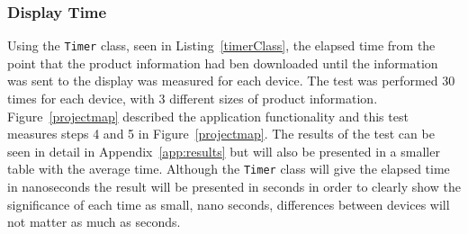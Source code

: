 %       
%		

\subsubsection{Display Time}

Using the \texttt{Timer} class, seen in Listing~\ref{timerClass}, the elapsed time from the point that the product information had ben downloaded until the information was sent to the display was measured for each device. The test was performed 30 times for each device, with 3 different sizes of product information. Figure~\ref{projectmap} described the application functionality and this test measures steps 4 and 5 in Figure~\ref{projectmap}. The results of the test can be seen in detail in Appendix~\ref{app:results} but will also be presented in a smaller table with the average time. %
Although the \texttt{Timer} class will give the elapsed time in nanoseconds the result will be presented in seconds in order to clearly show the significance of each time as small, nano seconds, differences between devices will not matter as much as seconds.

%       
%
